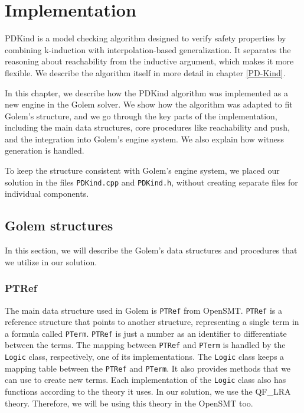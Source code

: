 \chapter{Implementation}
\noindent PDKind is a model checking algorithm designed to verify safety
properties by combining k-induction with interpolation-based generalization. It
separates the reasoning about reachability from the inductive argument, which
makes it more flexible. We describe the algorithm itself in more detail in
chapter \ref{PD-Kind}.

In this chapter, we describe how the PDKind algorithm was implemented
as a new engine in the Golem solver. We show how the algorithm was adapted to
fit Golem’s structure, and we go through the key parts of the implementation,
including the main data structures, core procedures like reachability and push,
and the integration into Golem's engine system. We also explain how witness
generation is handled.

To keep the structure consistent with Golem's engine system, we placed our
solution in the files \texttt{PDKind.cpp} and \texttt{PDKind.h}, without
creating separate files for individual components.

\section{Golem structures}
\noindent In this section, we will describe the Golem's data structures and procedures that we utilize in our solution. 

\subsection{PTRef}
\noindent The main data structure used in Golem is \texttt{PTRef} from OpenSMT.
\texttt{PTRef} is a reference structure that points to another structure,
representing a single term in a formula called \texttt{PTerm}. \texttt{PTRef}
is just a number as an identifier to differentiate between the terms. The
mapping between \texttt{PTRef} and \texttt{PTerm} is handled by the
\texttt{Logic} class, respectively, one of its implementations. The
\texttt{Logic} class keeps a mapping table between the \texttt{PTRef} and
\texttt{PTerm}. It also provides methods that we can use to create new terms.
Each implementation of the \texttt{Logic} class also has functions according to
the theory it uses. In our solution, we use the QF\_LRA theory. Therefore, we
will be using this theory in the OpenSMT too. 

